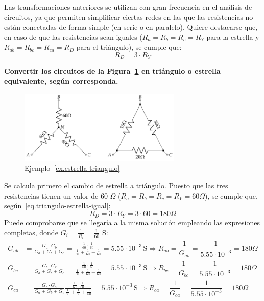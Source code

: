 	Las transformaciones anteriores se utilizan con gran
        frecuencia en el análisis de circuitos, ya que permiten
        simplificar ciertas redes en las que las resistencias no están
        conectadas de forma simple (en serie o en paralelo). Quiere
        destacarse que, en caso de que las resistencias sean iguales
        ($R_a=R_b=R_c=R_Y$ para la estrella y
        $R_{ab}=R_{bc}=R_{ca}=R_D$ para el triángulo), se cumple que:
	\begin{equation}\label{eq.triangulo-estrella-igual}
          \boxed{R_D=3\cdot R_Y}
	\end{equation}
	
	\begin{example}\label{ex.estrella-triangulo}
          \textbf{Convertir los circuitos de la
            Figura~\ref{fig:ejercicio7-bt1} en triángulo o estrella
            equivalente, según corresponda. }
          \begin{figure}[H]
            \centering
            \includegraphics[height=3.5cm]{../figs/ej7_BT1.pdf}
            \caption{Ejemplo~\ref{ex.estrella-triangulo}}
            \label{fig:ejercicio7-bt1}
          \end{figure}
 	
          Se calcula primero el cambio de estrella a triángulo. Puesto
          que las tres resistencias tienen un valor de 60 $\Omega$
          ($R_a=R_b=R_c=R_Y=60\Omega$), se cumple que,
          según~\eqref{eq.triangulo-estrella-igual}:
          \begin{equation*}
            R_D=3\cdot R_Y=3\cdot 60=180\Omega
          \end{equation*}
          Puede comprobarse que se llegaría a la misma solución
          empleando las expresiones completas, donde
          $G_i=\frac{1}{R_i}=\frac{1}{60}$ S:
          \begin{align*}
            G_{ab} &= \frac{G_a \cdot G_b}{G_a + G_b + G_c}=\frac{\frac{1}{60} \cdot \frac{1}{60}}{\frac{1}{60} + \frac{1}{60} + \frac{1}{60}}=5.55\cdot 10^{-3}\,\text{S}\Rightarrow R_{ab}=\dfrac{1}{G_{ab}}=\dfrac{1}{5.55\cdot 10^{-3}}=180\Omega\\[10pt]
            G_{bc} &= \frac{G_b \cdot G_c}{G_a + G_b + G_c}=\frac{\frac{1}{60} \cdot \frac{1}{60}}{\frac{1}{60} + \frac{1}{60} + \frac{1}{60}}=5.55\cdot 10^{-3}\,\text{S}\Rightarrow R_{bc}=\dfrac{1}{G_{bc}}=\dfrac{1}{5.55\cdot 10^{-3}}=180\Omega\\[10pt]
            G_{ca} &= \frac{G_c \cdot G_a}{G_a + G_b + G_c}\frac{\frac{1}{60} \cdot \frac{1}{60}}{\frac{1}{60} + \frac{1}{60} + \frac{1}{60}}=5.55\cdot 10^{-3}\,\text{S}\Rightarrow R_{ca}=\dfrac{1}{G_{ca}}=\dfrac{1}{5.55\cdot 10^{-3}}=180\Omega
          \end{align*}


\end{example}
